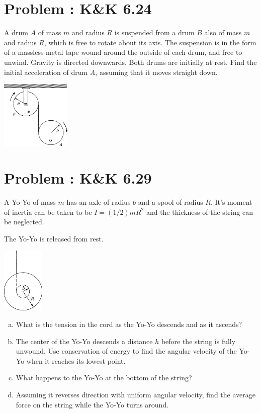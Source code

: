 \documentclass[problems]{esg8012pset}
\begin{document}
\section{Problem \thesection: K\&K 6.24}
  A drum $A$ of mass $m$ and radius $R$ is suspended from a drum $B$ also of mass $m$ and radius $R$, which is free to rotate about its axis. The suspension is in the form of a massless metal tape wound around the outside of each drum, and free to unwind. Gravity is directed downwards. Both drums are initially at rest. Find the initial acceleration of drum $A$, assuming that it moves straight down.
  \begin{center}\includegraphics[width=0.25\textwidth]{ps09_3}\end{center}
\section{Problem \thesection: K\&K 6.29}
  A Yo-Yo of mass $m$ has an axle of radius $b$ and a spool of radius $R$. It's moment of inertia can be taken to be $I = (1/2)mR^2$ and the thickness of the string can be neglected.

  The Yo-Yo is released from rest.
  \begin{center}\includegraphics[width=0.15\textwidth]{ps09_4}\end{center}
  \begin{enumerate}[(a)]
    \item What is the tension in the cord as the Yo-Yo descends and as it ascends?
    \item The center of the Yo-Yo descends a distance $h$ before the string is fully unwound. Use conservation of energy to find the angular velocity of the Yo-Yo when it reaches its lowest point.
    \item What happens to the Yo-Yo at the bottom of the string?
    \item Assuming it reverses direction with uniform angular velocity, find the average force on the string while the Yo-Yo turns around.
  \end{enumerate}
\end{document}
